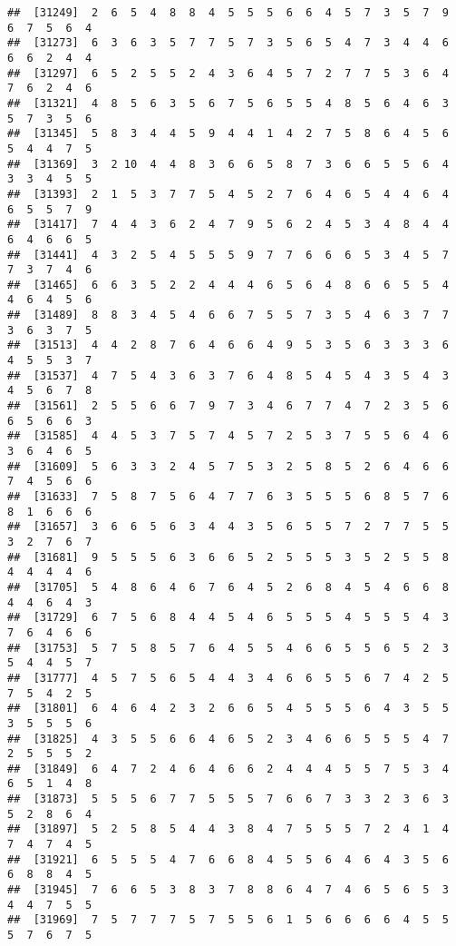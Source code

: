 \documentclass[
]{book}
\begin{document}
\begin{verbatim}
##  [31249]  2  6  5  4  8  8  4  5  5  5  6  6  4  5  7  3  5  7  9  6  7  5  6  4
##  [31273]  6  3  6  3  5  7  7  5  7  3  5  6  5  4  7  3  4  4  6  6  6  2  4  4
##  [31297]  6  5  2  5  5  2  4  3  6  4  5  7  2  7  7  5  3  6  4  7  6  2  4  6
##  [31321]  4  8  5  6  3  5  6  7  5  6  5  5  4  8  5  6  4  6  3  5  7  3  5  6
##  [31345]  5  8  3  4  4  5  9  4  4  1  4  2  7  5  8  6  4  5  6  5  4  4  7  5
##  [31369]  3  2 10  4  4  8  3  6  6  5  8  7  3  6  6  5  5  6  4  3  3  4  5  5
##  [31393]  2  1  5  3  7  7  5  4  5  2  7  6  4  6  5  4  4  6  4  6  5  5  7  9
##  [31417]  7  4  4  3  6  2  4  7  9  5  6  2  4  5  3  4  8  4  4  6  4  6  6  5
##  [31441]  4  3  2  5  4  5  5  5  9  7  7  6  6  6  5  3  4  5  7  7  3  7  4  6
##  [31465]  6  6  3  5  2  2  4  4  4  6  5  6  4  8  6  6  5  5  4  4  6  4  5  6
##  [31489]  8  8  3  4  5  4  6  6  7  5  5  7  3  5  4  6  3  7  7  3  6  3  7  5
##  [31513]  4  4  2  8  7  6  4  6  6  4  9  5  3  5  6  3  3  3  6  4  5  5  3  7
##  [31537]  4  7  5  4  3  6  3  7  6  4  8  5  4  5  4  3  5  4  3  4  5  6  7  8
##  [31561]  2  5  5  6  6  7  9  7  3  4  6  7  7  4  7  2  3  5  6  6  5  6  6  3
##  [31585]  4  4  5  3  7  5  7  4  5  7  2  5  3  7  5  5  6  4  6  3  6  4  6  5
##  [31609]  5  6  3  3  2  4  5  7  5  3  2  5  8  5  2  6  4  6  6  7  4  5  6  6
##  [31633]  7  5  8  7  5  6  4  7  7  6  3  5  5  5  6  8  5  7  6  8  1  6  6  6
##  [31657]  3  6  6  5  6  3  4  4  3  5  6  5  5  7  2  7  7  5  5  3  2  7  6  7
##  [31681]  9  5  5  5  6  3  6  6  5  2  5  5  5  3  5  2  5  5  8  4  4  4  4  6
##  [31705]  5  4  8  6  4  6  7  6  4  5  2  6  8  4  5  4  6  6  8  4  4  6  4  3
##  [31729]  6  7  5  6  8  4  4  5  4  6  5  5  5  4  5  5  5  4  3  7  6  4  6  6
##  [31753]  5  7  5  8  5  7  6  4  5  5  4  6  6  5  5  6  5  2  3  5  4  4  5  7
##  [31777]  4  5  7  5  6  5  4  4  3  4  6  6  5  5  6  7  4  2  5  7  5  4  2  5
##  [31801]  6  4  6  4  2  3  2  6  6  5  4  5  5  5  6  4  3  5  5  3  5  5  5  6
##  [31825]  4  3  5  5  6  6  4  6  5  2  3  4  6  6  5  5  5  4  7  2  5  5  5  2
##  [31849]  6  4  7  2  4  6  4  6  6  2  4  4  4  5  5  7  5  3  4  6  5  1  4  8
##  [31873]  5  5  5  6  7  7  5  5  5  7  6  6  7  3  3  2  3  6  3  5  2  8  6  4
##  [31897]  5  2  5  8  5  4  4  3  8  4  7  5  5  5  7  2  4  1  4  7  4  7  4  5
##  [31921]  6  5  5  5  4  7  6  6  8  4  5  5  6  4  6  4  3  5  6  6  8  8  4  5
##  [31945]  7  6  6  5  3  8  3  7  8  8  6  4  7  4  6  5  6  5  3  4  4  7  5  5
##  [31969]  7  5  7  7  7  5  7  5  5  6  1  5  6  6  6  6  4  5  5  5  7  6  7  5

\end{verbatim}
\end{document}
